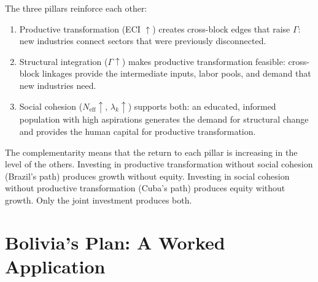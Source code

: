 \documentclass[../structural_economics_book.tex]{subfiles}
\begin{document}
\begin{conjecture}\label{ch26:prop:complementary}
The three pillars reinforce each other:
\begin{enumerate}
\item Productive transformation (ECI $\uparrow$) creates cross-block edges that raise $\Gamma$: new industries connect sectors that were previously disconnected.
\item Structural integration ($\Gamma \uparrow$) makes productive transformation feasible: cross-block linkages provide the intermediate inputs, labor pools, and demand that new industries need.
\item Social cohesion ($N_{\text{eff}} \uparrow$, $\lambda_k \uparrow$) supports both: an educated, informed population with high aspirations generates the demand for structural change and provides the human capital for productive transformation.
\end{enumerate}

The complementarity means that the return to each pillar is increasing in the level of the others. Investing in productive transformation without social cohesion (Brazil's path) produces growth without equity. Investing in social cohesion without productive transformation (Cuba's path) produces equity without growth. Only the joint investment produces both.
\end{conjecture}


\section{Bolivia's Plan: A Worked Application}
\label{ch26:sec:bolivia}
\end{document}
